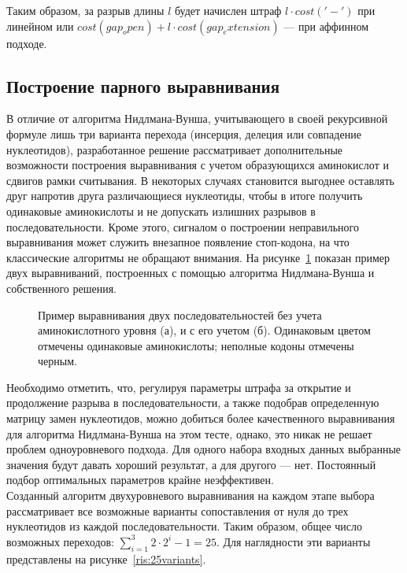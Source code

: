 \indent Таким образом, за разрыв длины $l$ будет начислен штраф $l\cdot cost('-')$ при линейном или $cost(gap_open) + l\cdot cost(gap_extension)$ --- при аффинном подходе.

\subsection[Построение парного выравнивания]{\large Построение парного выравнивания} \label{PairwiseAlign}
\hspace{\parindent} В отличие от алгоритма Нидлмана-Вунша, учитывающего в своей рекурсивной формуле лишь три варианта перехода (инсерция, делеция или совпадение нуклеотидов), разработанное решение рассматривает дополнительные возможности построения выравнивания с учетом образующихся аминокислот и сдвигов рамки считывания. В некоторых случаях становится выгоднее оставлять друг напротив друга различающиеся нуклеотиды, чтобы в итоге получить одинаковые аминокислоты и не допускать излишних разрывов в последовательности. Кроме этого, сигналом о построении неправильного выравнивания может служить внезапное появление стоп-кодона, на что классические алгоритмы не обращают внимания. На рисунке~\ref{ris:NWvsMULTY} показан пример двух выравниваний, построенных с помощью алгоритма Нидлмана-Вунша и собственного решения.

\begin{figure}[h]
	\begin{minipage}[h]{0.49\linewidth}
	\end{minipage}
	\hfill
	\begin{minipage}[h]{0.49\linewidth}
	\end{minipage}
	\caption{Пример выравнивания двух последовательностей без учета аминокислотного уровня (а), и с его учетом (б). Одинаковым цветом отмечены одинаковые аминокислоты; неполные кодоны отмечены черным.}
	\label{ris:NWvsMULTY}
\end{figure}

\indent Необходимо отметить, что, регулируя параметры штрафа за открытие и продолжение разрыва в последовательности, а также подобрав определенную матрицу замен нуклеотидов, можно добиться более качественного выравнивания для алгоритма Нидлмана-Вунша на этом тесте, однако, это никак не решает проблем одноуровневого подхода. Для одного набора входных данных выбранные значения будут давать хороший результат, а для другого --- нет. Постоянный подбор оптимальных параметров крайне неэффективен.\\
\indent Созданный алгоритм двухуровневого выравнивания на каждом этапе выбора рассматривает все возможные варианты сопоставления от нуля до трех нуклеотидов из каждой последовательности. Таким образом, общее число возможных переходов: $\sum_{i=1}^3 2\cdot 2^i-1=25$. Для наглядности эти варианты представлены на рисунке~\ref{ris:25variants}. 

